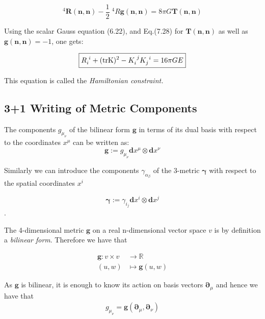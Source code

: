 \documentclass[12pt]{article}
\renewcommand{\vec}[1]{\bm{#1}}
\numberwithin{equation}{section}
\numberwithin{theorem}{subsection}
\begin{document}
\begin{itemize}
    \begin{equation}

        ^{4}\vec{R}(\vec{n},\vec{n}) - \frac{1}{2} \; ^{4}R \vec{g}(\vec{n},\vec{n}) = 8 \pi G \vec{T}(\vec{n},\vec{n}) 

    \end{equation}

    Using the scalar Gauss equation (6.22), and Eq.(7.28) for $\vec{T}(\vec{n},\vec{n})$ as well as  $\vec{g}(\vec{n},\vec{n}) = -1$, one gets:

    \begin{equation}

        \boxed{\tensor{R}{_i^i} + (\textrm{trK})^{2} - \tensor{K}{_i^j}\tensor{K}{_j^i} = 16 \pi G E} 

    \end{equation}

    This equation is called the \textit{Hamiltonian constraint.}

\end{itemize}

\subsection{3+1 Writing of Metric Components}

The components $g_{\mu}_{\nu}$ of the bilinear form $\vec{g}$ in terms of its dual basis with respect to the coordinates $x^{\mu}$ can be written as: $$\vec{g} := g_{\mu}_{\nu}\vec{d}x^{\mu}\otimes\vec{d}x^{\nu}$$

Similarly we can introduce the components $\gamma_{\alpha}_{\beta}$ of the 3-metric $\vec{\gamma}$ with respect to the spatial coordinates $x^i$

$$\vec{\gamma} := \gamma_{i}_{j}\vec{d}x^{i}\otimes\vec{d}x^{j}$$.

\newline

The 4-dimensional metric $\vec{g}$ on a real n-dimensional vector space $v$ is by definition a \textit{bilinear form}. Therefore we have that

\begin{align*}

    \vec{g} \colon v \times v &\to \mathbb{R} \\

                   (u,w) &\mapsto  \vec{g}(u,w)

\end{align*}

As $\vec{g}$ is bilinear, it is enough to know its action on basis vectors $\vec{\partial}_{\mu}$ and hence we have that \begin{align*}

    g_{\mu}_{\nu} = \vec{g} (\vec{\partial}_{\mu},\vec{\partial}_{\nu})

\end{align*}
\end{document}
